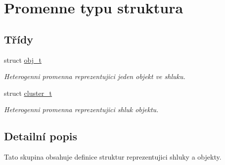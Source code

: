 \hypertarget{group__StructPromenne}{}\section{Promenne typu struktura}
\label{group__StructPromenne}
\subsection*{Třídy}
\begin{DoxyCompactItemize}
\item 
struct \hyperlink{structobj__t}{obj\+\_\+t}
\begin{DoxyCompactList}\small\item\em Heterogenni promenna reprezentujici jeden objekt ve shluku. \end{DoxyCompactList}\item 
struct \hyperlink{structcluster__t}{cluster\+\_\+t}
\begin{DoxyCompactList}\small\item\em Heterogenni promenna reprezentujici shluk objektu. \end{DoxyCompactList}\end{DoxyCompactItemize}


\subsection{Detailní popis}
Tato skupina obsahuje definice struktur reprezentujici shluky a objekty. 